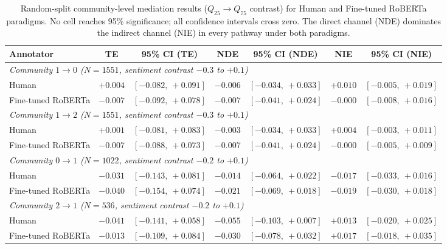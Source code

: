 \begin{table}[h]
\centering
\footnotesize
\begin{tabular}{lcccccc}
\toprule
Annotator & TE & 95\% CI (TE) & NDE & 95\% CI (NDE) & NIE & 95\% CI (NIE) \\
\midrule
\multicolumn{7}{l}{\textit{Community $1 \to 0$ ($N=\num{1551}$, sentiment contrast $-0.3$ to $+0.1$)}} \\
\midrule
Human              & $+0.004$ & $[-0.082,\ +0.091]$ & $-0.006$ & $[-0.034,\ +0.033]$ & $+0.010$ & $[-0.005,\ +0.019]$ \\
Fine-tuned RoBERTa & $-0.007$ & $[-0.092,\ +0.078]$ & $-0.007$ & $[-0.041,\ +0.024]$ & $-0.000$ & $[-0.008,\ +0.016]$ \\
\midrule
\multicolumn{7}{l}{\textit{Community $1 \to 2$ ($N=\num{1551}$, sentiment contrast $-0.3$ to $+0.1$)}} \\
\midrule
Human              & $+0.001$ & $[-0.081,\ +0.083]$ & $-0.003$ & $[-0.034,\ +0.033]$ & $+0.004$ & $[-0.003,\ +0.011]$ \\
Fine-tuned RoBERTa & $-0.007$ & $[-0.088,\ +0.073]$ & $-0.007$ & $[-0.041,\ +0.024]$ & $-0.000$ & $[-0.005,\ +0.009]$ \\
\midrule
\multicolumn{7}{l}{\textit{Community $0 \to 1$ ($N=\num{1022}$, sentiment contrast $-0.2$ to $+0.1$)}} \\
\midrule
Human              & $-0.031$ & $[-0.143,\ +0.081]$ & $-0.014$ & $[-0.064,\ +0.022]$ & $-0.017$ & $[-0.033,\ +0.016]$ \\
Fine-tuned RoBERTa & $-0.040$ & $[-0.154,\ +0.074]$ & $-0.021$ & $[-0.069,\ +0.018]$ & $-0.019$ & $[-0.030,\ +0.018]$ \\
\midrule
\multicolumn{7}{l}{\textit{Community $2 \to 1$ ($N=536$, sentiment contrast $-0.2$ to $+0.1$)}} \\
\midrule
Human              & $-0.041$ & $[-0.141,\ +0.058]$ & $-0.055$ & $[-0.103,\ +0.007]$ & $+0.013$ & $[-0.020,\ +0.025]$ \\
Fine-tuned RoBERTa & $-0.013$ & $[-0.109,\ +0.084]$ & $-0.030$ & $[-0.078,\ +0.032]$ & $+0.017$ & $[-0.018,\ +0.035]$ \\
\bottomrule
\end{tabular}
\caption{Random-split community-level mediation results ($Q_{25} \to Q_{75}$ contrast) for Human and Fine-tuned RoBERTa paradigms. No cell reaches 95\% significance; all confidence intervals cross zero. The direct channel (NDE) dominates the indirect channel (NIE) in every pathway under both paradigms.}
\label{tab:random-community-mediation}
\end{table}

